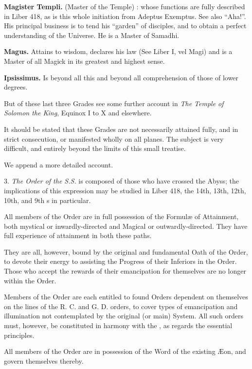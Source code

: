 \textbf{Magister Templi.} \textemdash{} (Master of the Temple) : whose functions are fully described in Liber 418, as is this whole initiation from Adeptus Exemptus. See also \enquote{Aha!}. His principal business is to tend his \enquote{garden} of disciples, and to obtain a perfect understanding of the Universe. He is a Master of Samadhi.

\textbf{Magus.} \textemdash{} Attains to wisdom, declares his law (See Liber I, vel Magi) and is a Master of all Magick in its greatest and
highest sense.

\textbf{Ipsissimus.} \textemdash{} Is beyond all this and beyond all comprehension of those of lower degrees.

But of these last three Grades see some further account in \textit{The Temple of Solomon the King}, Equinox I to X and elsewhere.

It should be stated that these Grades are not necessarily attained fully, and in strict consecution, or manifested wholly on all planes. The subject is very difficult, and entirely beyond the limits of this small treatise.

We append a more detailed account.

\vspace{\baselineskip}

3. \textit{The Order of the S.S.} is composed of those who have crossed the Abyss; the implications of this expression may be studied in Liber 418, the 14th, 13th, 12th, 10th, and 9th \AEthyr{}s in particular.

All members of the Order are in full possession of the Formul\ae{} of Attainment, both mystical or inwardly-directed and Magical or outwardly-directed. They have full experience of attainment in both these paths.

They are all, however, bound by the original and fundamental Oath of the Order, to devote their energy to assisting the Progress of their Inferiors in the Order. Those who accept the rewards of their emancipation for themselves are no longer within the Order.

Members of the Order are each entitled to found Orders dependent on themselves on the lines of the R. C. and G. D. orders, to cover types of emancipation and illumination not contemplated by the original (or main) System. All such orders must, however, be constituted in harmony with the \Argentium{}, as regards the essential principles.

All members of the Order are in possession of the Word of the existing \AE{}on, and govern themselves thereby.

